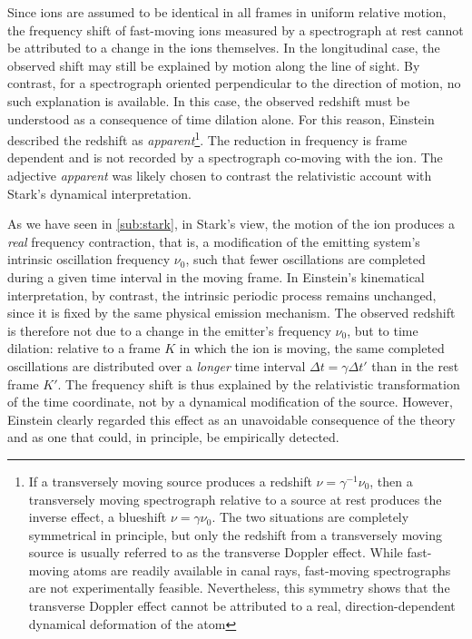 \documentclass[pdflatex]{sn-jnl}
\begin{document}
Since ions are assumed to be identical in all frames in uniform relative motion, the frequency shift of fast-moving ions measured by a spectrograph at rest cannot be attributed to a change in the ions themselves. In the longitudinal case, the observed shift may still be explained by motion along the line of sight. By contrast, for a spectrograph oriented perpendicular to the direction of motion, no such explanation is available. In this case, the observed redshift must be understood as a consequence of time dilation alone. For this reason, Einstein described the redshift as \emph{apparent}\footnote{If a transversely moving source produces a redshift $\nu=\gamma^{-1}\nu_0$, then a transversely moving spectrograph relative to a source at rest produces the inverse effect, a blueshift $\nu=\gamma\nu_0$. The two situations are completely symmetrical in principle, but only the redshift from a transversely moving source is usually referred to as the transverse Doppler effect. While fast-moving atoms are readily available in canal rays, fast-moving spectrographs are not experimentally feasible. Nevertheless, this symmetry shows that the transverse Doppler effect cannot be attributed to a real, direction-dependent dynamical deformation of the atom}. The reduction in frequency is frame dependent and is not recorded by a spectrograph co-moving with the ion. The adjective \emph{apparent} was likely chosen to contrast the relativistic account with Stark’s dynamical interpretation.

As we have seen in \cref{sub:stark}, in Stark’s view, the motion of the ion produces a \emph{real} frequency contraction, that is, a modification of the emitting system’s intrinsic oscillation frequency $\nu_0$, such that fewer oscillations are completed during a given time interval in the moving frame. In Einstein’s kinematical interpretation, by contrast, the intrinsic periodic process remains unchanged, since it is fixed by the same physical emission mechanism. The observed redshift is therefore not due to a change in the emitter’s frequency $\nu_0$, but to time dilation: relative to a frame $K$ in which the ion is moving, the same completed oscillations are distributed over a \emph{longer} time interval $\Delta t=\gamma\Delta t'$ than in the rest frame $K'$. The frequency shift is thus explained by the relativistic transformation of the time coordinate, not by a dynamical modification of the source. However, Einstein clearly regarded this  effect as an unavoidable consequence of the theory and as one that could, in principle, be empirically detected. 
\end{document}
